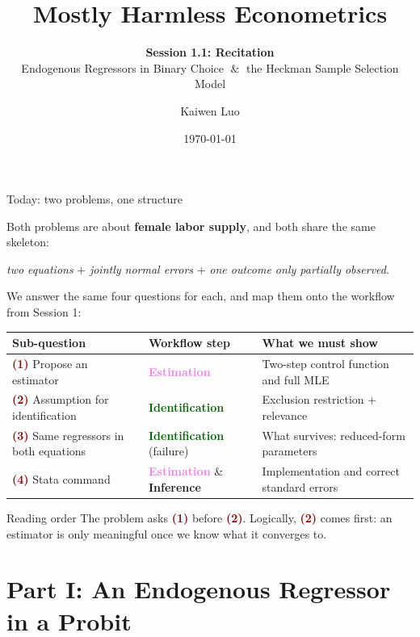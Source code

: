 \documentclass[aspectratio=169,11pt]{beamer}
\title{Mostly Harmless Econometrics}
\subtitle{
\textbf{Session 1.1: Recitation}
\\[0.55em]
Endogenous Regressors in Binary Choice
$\;\&\;$
the Heckman Sample Selection Model
}
\author{Kaiwen Luo}
\institute{Washington University in St.Louis}
\date{\today}
\newcommand{\Ident}{\textcolor{DarkGreen}{\textbf{Identification}}}
\newcommand{\Est}{\textcolor{violet}{\textbf{Estimation}}}
\newcommand{\Infer}{\textcolor{orange!80!black}{\textbf{Inference}}}
\newcommand{\Part}[1]{\textcolor{DarkRed}{\textbf{(#1)}}}
\begin{document}
\begin{frame}
    \titlepage
\end{frame}

\begin{frame}{Today: two problems, one structure}

Both problems are about \textbf{female labor supply}, and both share the
same skeleton:
\begin{center}
\textit{two equations} $+$ \textit{jointly normal errors} $+$
\textit{one outcome only partially observed}.
\end{center}

We answer the same four questions for each, and map them onto the
workflow from Session 1:

\vspace{0.05em}

\small
\begin{tabular}{B{0.30\textwidth} L{0.24\textwidth} L{0.36\textwidth}}
\toprule
Sub-question & Workflow step & What we must show\\
\midrule
\Part{1} Propose an estimator & \Est &
  Two-step control function and full MLE\\[0.1em]
\Part{2} Assumption for identification & \Ident &
  Exclusion restriction $+$ relevance\\[0.1em]
\Part{3} Same regressors in both equations & \Ident{} (failure) &
  What survives: reduced-form parameters\\[0.1em]
\Part{4} Stata command & \Est{} \& \Infer &
  Implementation and correct standard errors\\
\bottomrule
\end{tabular}

\vspace{0.4em}

\begin{alertblock}{Reading order}
The problem asks \Part{1} before \Part{2}. Logically, \Part{2} comes first:
an estimator is only meaningful once we know what it converges to.
\end{alertblock}

\end{frame}

\section{Part I: An Endogenous Regressor in a Probit}
\end{document}

